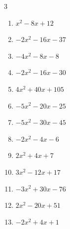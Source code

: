 \begin{multicols}{3}
\begin{enumerate}

  \item $x^{2}-8x+12$


\columnbreak %

  \item $-2x^{2}-16x-37$


  \item $-4x^{2}-8x-8$


  \item $-2x^{2}-16x-30$


  \item $4x^{2}+40x+105$


  \item $-5x^{2}-20x-25$


  \item $-5x^{2}-30x-45$


  \item $-2x^{2}-4x-6$


  \item $2x^{2}+4x+7$


  \item $3x^{2}-12x+17$


  \item $-3x^{2}+30x-76$


\columnbreak %

\resetques

  \item $2x^{2}-20x+51$


  \item $-2x^{2}+4x+1$


\end{enumerate}
\end{multicols}
